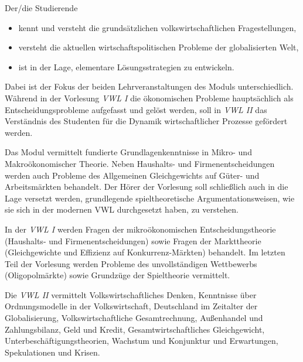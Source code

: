 \begin{module}
\begin{learningoutcomes}
Der/die Studierende

 \begin{itemize}\item kennt und versteht die grundsätzlichen volkswirtschaftlichen Fragestellungen,  \item versteht die aktuellen wirtschaftspolitischen Probleme der globalisierten Welt,   \item ist in der Lage, elementare Lösungsstrategien zu entwickeln.   \end{itemize}

Dabei ist der Fokus der beiden Lehrveranstaltungen des Moduls unterschiedlich. Während in der Vorlesung \emph{VWL I} die ökonomischen Probleme hauptsächlich als Entscheidungsprobleme aufgefasst und gelöst werden, soll in \emph{VWL II} das Verständnis des Studenten für die Dynamik wirtschaftlicher Prozesse gefördert werden.


\end{learningoutcomes}

\begin{content}
Das Modul vermittelt fundierte Grundlagenkenntnisse in Mikro- und Makroökonomischer Theorie. Neben Haushalts- und Firmenentscheidungen werden auch Probleme des Allgemeinen Gleichgewichts auf Güter- und Arbeitsmärkten behandelt. Der Hörer der Vorlesung soll schließlich auch in die Lage versetzt werden, grundlegende spieltheoretische Argumentationsweisen, wie sie sich in der modernen VWL durchgesetzt haben, zu verstehen.

 

In der \emph{VWL I }werden Fragen der mikroökonomischen Entscheidungstheorie (Haushalts- und Firmenentscheidungen) sowie Fragen der Markttheorie (Gleichgewichte und Effizienz auf Konkurrenz-Märkten) behandelt. Im letzten Teil der Vorlesung werden Probleme des unvollständigen Wettbewerbs (Oligopolmärkte) sowie Grundzüge der Spieltheorie vermittelt.

 

Die \emph{VWL II }vermittelt Volkswirtschaftliches Denken, Kenntnisse über Ordnungsmodelle in der Volkswirtschaft, Deutschland im Zeitalter der Globalisierung, Volkswirtschaftliche Gesamtrechnung, Außenhandel und Zahlungsbilanz, Geld und Kredit, Gesamtwirtschaftliches Gleichgewicht, Unterbeschäftigungstheorien, Wachstum und Konjunktur und Erwartungen, Spekulationen und Krisen.


\end{content}



\end{module}

